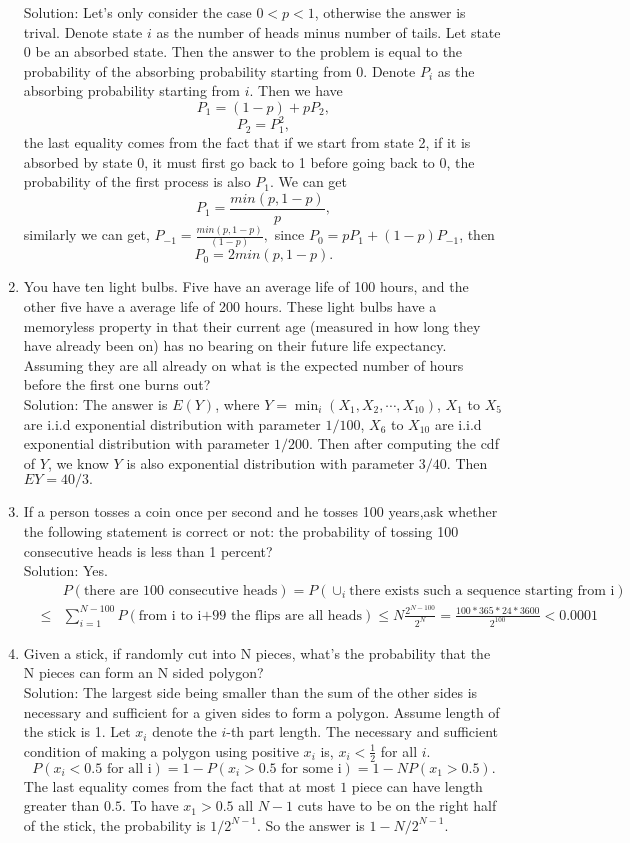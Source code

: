 \documentclass[10pt, onecolumn, draftcls]{IEEEtran}
\begin{document}
\begin{enumerate}
{\color{red} Solution}: Let's only consider the case $0<p<1$, otherwise the answer is trival. Denote state $i$ as the number of heads minus number of tails. Let state $0$ be an absorbed state. Then the answer to the problem is equal to the probability of the absorbing probability starting from 0. Denote $P_i$ as the absorbing probability starting from $i$. Then we have
$$P_1=(1-p)+pP_2,$$
$$P_2=P_1^2,$$
the last equality comes from the fact that if we start from state 2, if it is absorbed by state 0, it must first go back to 1 before going back to 0, the probability of the first process is also $P_1$. We can get 
$$P_1=\frac{min(p,1-p)}{p},$$
similarly we can get, $P_{-1}=\frac{min(p,1-p)}{(1-p)},$ since $P_0=pP_1+(1-p)P_{-1}$, then 
$$P_0=2min(p,1-p).$$
\item
You have ten light bulbs. Five have an average life of 100 hours, and the other five have a average life of 200 hours. These light bulbs have a memoryless property in that their current age (measured in how long they have already been on) has no bearing on their future life expectancy. Assuming they are all already on what is the expected number of hours before the first one burns out?\\
{\color{red} Solution}: The answer is $E(Y)$, where $Y=\min_i(X_1, X_2, \cdots, X_{10})$, $X_1$ to $X_5$ are i.i.d exponential distribution with parameter $1/100$, $X_6$ to $X_{10}$ are i.i.d exponential distribution with parameter $1/200$. Then after computing the cdf of $Y$, we know $Y$ is also exponential distribution with parameter $3/40$. Then $EY=40/3.$
\item
If a person tosses a coin once per second and he tosses 100 years,ask whether the following statement is correct or not: the probability of tossing 100 consecutive heads is less than 1 percent?\\
{\color{red} Solution}: Yes.
\begin{eqnarray}
&&P(\text{there are 100 consecutive heads})=P(\cup_i \text{there exists such a sequence starting from i}) \nonumber \\ 
&\le& \sum_{i=1}^{N-100}P(\text{from i to i+99 the flips are all heads})\le N\frac{2^{N-100}}{2^N}=\frac{100*365*24*3600}{2^{100}}<0.0001 \nonumber
\end{eqnarray}
\item
Given a stick, if randomly cut into N pieces, what's the probability that the N pieces can form an N sided polygon?\\
{\color{red} Solution}: The largest side being smaller than the sum of the other sides is necessary and sufficient for a given sides to form a polygon. Assume length of the stick is 1. Let $x_i$ denote the $i$-th part length. The necessary and sufficient condition of making a polygon using positive $x_i$ is, $x_i<\frac{1}{2}$ for all $i$.
$$P(x_i<0.5\text{ for all i})=1-P(x_i>0.5 \text{ for some i})=1-NP(x_1>0.5).$$
The last equality comes from the fact that at most $1$ piece can have length greater than $0.5$.
To have $x_1>0.5$ all $N-1$ cuts have to be on the right half of the stick, the probability is $1/2^{N-1}$. So the answer is $1-N/2^{N-1}.$


\end{enumerate}
\end{document}
